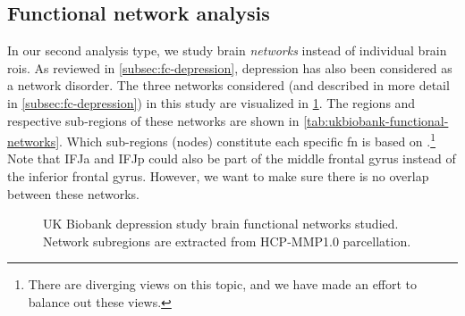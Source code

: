 \subsection{Functional network analysis}\label{subsec:ukb-fn-analysis}

In our second analysis type, we study brain \emph{networks} instead of individual brain \glspl{roi}.
As reviewed in \cref{subsec:fc-depression}, depression has also been considered as a network disorder.
%
The three networks considered (and described in more detail in \cref{subsec:fc-depression}) in this study are visualized in \cref{fig:ukb-brain-functional-networks}.
The regions and respective sub-regions of these networks are shown in \cref{tab:ukbiobank-functional-networks}.
Which sub-regions (nodes) constitute each specific \gls{fn} is based on \textcite{Fan2016, Uddin2019, Oane2020}.\footnote{There are diverging views on this topic, and we have made an effort to balance out these views.}
Note that IFJa and IFJp could also be part of the middle frontal gyrus instead of the inferior frontal gyrus.
However, we want to make sure there is no overlap between these networks.


\begin{figure}[t]
  \centering
  \caption{
    UK Biobank depression study brain functional networks studied.
    Network subregions are extracted from HCP-MMP1.0 parcellation.
  }\label{fig:ukb-brain-functional-networks}
\end{figure}


